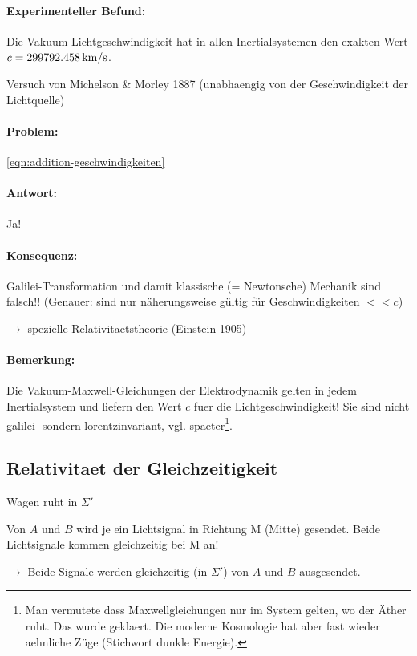 \documentclass{scrartcl}
\begin{document}
\paragraph{Experimenteller Befund:}
Die Vakuum-Lichtgeschwindigkeit hat in allen Inertialsystemen den
exakten Wert $c=\unit[299792.458]{\textrm{km}/\textrm{s}}$.

Versuch von Michelson \& Morley 1887 (unabhaengig von der
Geschwindigkeit der Lichtquelle)

\paragraph{Problem:}
\ref{eqn:addition-geschwindigkeiten}


\paragraph{Antwort:} Ja!

\paragraph{Konsequenz:} Galilei-Transformation und damit klassische (=
Newtonsche) Mechanik sind falsch!!  (Genauer: sind nur
n\"aherungsweise g\"ultig f\"ur Geschwindigkeiten $<< c$)

$\rightarrow$ spezielle Relativitaetstheorie (Einstein 1905)

\paragraph{Bemerkung:}
Die Vakuum-Maxwell-Gleichungen der Elektrodynamik gelten in jedem
Inertialsystem und liefern den Wert $c$ fuer die Lichtgeschwindigkeit!
Sie sind nicht galilei- sondern lorentzinvariant,
vgl. spaeter\footnote{Man vermutete dass Maxwellgleichungen nur im
  System gelten, wo der \"Ather ruht. Das wurde geklaert. Die moderne
  Kosmologie hat aber fast wieder aehnliche Z\"uge (Stichwort dunkle
  Energie).}.

\subsection{Relativitaet der Gleichzeitigkeit}


Wagen ruht in $\Sigma'$

Von $A$ und $B$ wird je ein Lichtsignal in Richtung M (Mitte)
gesendet. Beide Lichtsignale kommen gleichzeitig bei M an!

$\rightarrow$ Beide Signale werden gleichzeitig (in $\Sigma'$) von $A$
und $B$ ausgesendet.
\end{document}
